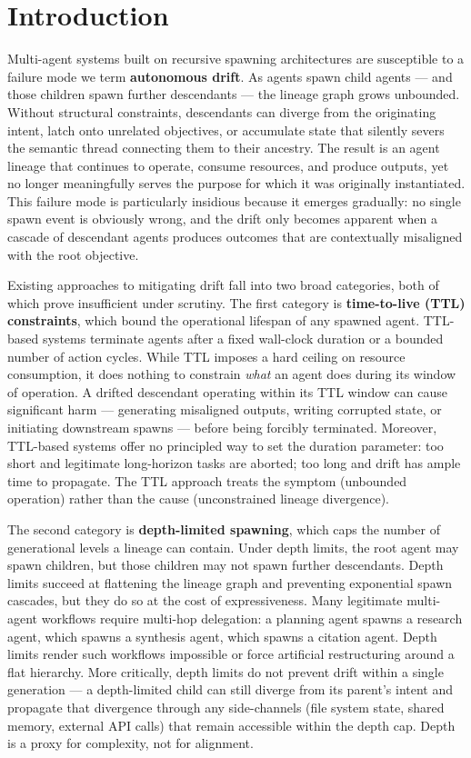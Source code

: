 \section{Introduction}

Multi-agent systems built on recursive spawning architectures are susceptible to a failure mode we term \textbf{autonomous drift}. As agents spawn child agents — and those children spawn further descendants — the lineage graph grows unbounded. Without structural constraints, descendants can diverge from the originating intent, latch onto unrelated objectives, or accumulate state that silently severs the semantic thread connecting them to their ancestry. The result is an agent lineage that continues to operate, consume resources, and produce outputs, yet no longer meaningfully serves the purpose for which it was originally instantiated. This failure mode is particularly insidious because it emerges gradually: no single spawn event is obviously wrong, and the drift only becomes apparent when a cascade of descendant agents produces outcomes that are contextually misaligned with the root objective.

Existing approaches to mitigating drift fall into two broad categories, both of which prove insufficient under scrutiny. The first category is \textbf{time-to-live (TTL) constraints}, which bound the operational lifespan of any spawned agent. TTL-based systems terminate agents after a fixed wall-clock duration or a bounded number of action cycles. While TTL imposes a hard ceiling on resource consumption, it does nothing to constrain \textit{what} an agent does during its window of operation. A drifted descendant operating within its TTL window can cause significant harm — generating misaligned outputs, writing corrupted state, or initiating downstream spawns — before being forcibly terminated. Moreover, TTL-based systems offer no principled way to set the duration parameter: too short and legitimate long-horizon tasks are aborted; too long and drift has ample time to propagate. The TTL approach treats the symptom (unbounded operation) rather than the cause (unconstrained lineage divergence).

The second category is \textbf{depth-limited spawning}, which caps the number of generational levels a lineage can contain. Under depth limits, the root agent may spawn children, but those children may not spawn further descendants. Depth limits succeed at flattening the lineage graph and preventing exponential spawn cascades, but they do so at the cost of expressiveness. Many legitimate multi-agent workflows require multi-hop delegation: a planning agent spawns a research agent, which spawns a synthesis agent, which spawns a citation agent. Depth limits render such workflows impossible or force artificial restructuring around a flat hierarchy. More critically, depth limits do not prevent drift within a single generation — a depth-limited child can still diverge from its parent's intent and propagate that divergence through any side-channels (file system state, shared memory, external API calls) that remain accessible within the depth cap. Depth is a proxy for complexity, not for alignment.

